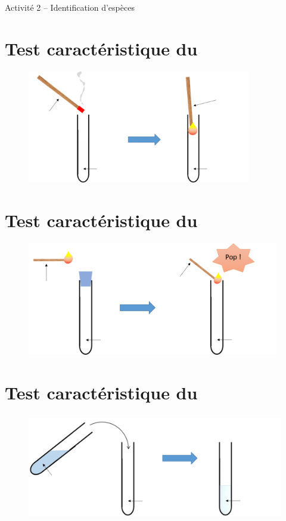 



\begin{header}
Activité 2 -- Identification d'espèces
\end{header}

\section*{Test caractéristique du}

\begin{figure}[h]
\center
\includegraphics[height=140pt]{images/test_o2.png}
\end{figure}

\section*{Test caractéristique du}

\begin{figure}[h]
\center
\includegraphics[height=140pt]{images/test_h2.png}
\end{figure}

\section*{Test caractéristique du}

\begin{figure}[h]
\center
\includegraphics[height=130pt]{images/test_co2.png}
\end{figure}

